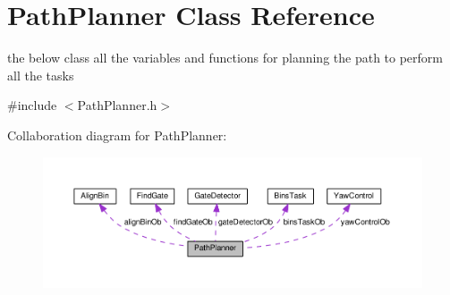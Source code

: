 \hypertarget{classPathPlanner}{}\section{Path\+Planner Class Reference}
\label{classPathPlanner}


the below class all the variables and functions for planning the path to perform all the tasks  




{\ttfamily \#include $<$Path\+Planner.\+h$>$}



Collaboration diagram for Path\+Planner\+:
\nopagebreak
\begin{figure}[H]
\begin{center}
\leavevmode
\includegraphics[width=350pt]{classPathPlanner__coll__graph}
\end{center}
\end{figure}
